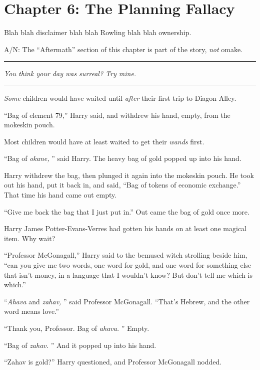 \chapter{Chapter 6: The Planning Fallacy}
Blah blah disclaimer blah blah Rowling blah blah ownership.

A/N: The ``Aftermath'' section of this chapter is part of the story,
\emph{not} omake.

\begin{center}\rule{3in}{0.4pt}\end{center}

\emph{You think your day was surreal? Try mine.}

\begin{center}\rule{3in}{0.4pt}\end{center}

\emph{Some} children would have waited until \emph{after} their first
trip to Diagon Alley.

``Bag of element 79,'' Harry said, and withdrew his hand, empty, from
the mokeskin pouch.

Most children would have at least waited to get their \emph{wands}
first.

``Bag of \emph{okane,} '' said Harry. The heavy bag of gold popped up into
his hand.

Harry withdrew the bag, then plunged it again into the mokeskin pouch.
He took out his hand, put it back in, and said, ``Bag of tokens of
economic exchange.'' That time his hand came out empty.

``Give me back the bag that I just put in.'' Out came the bag of gold
once more.

Harry James Potter-Evans-Verres had gotten his hands on at least one
magical item. Why wait?

``Professor McGonagall,'' Harry said to the bemused witch strolling
beside him, ``can you give me two words, one word for gold, and one word
for something else that isn't money, in a language that I wouldn't know?
But don't tell me which is which.''

``\emph{Ahava} and \emph{zahav,} '' said Professor McGonagall. ``That's
Hebrew, and the other word means love.''

``Thank you, Professor. Bag of \emph{ahava.} '' Empty.

``Bag of \emph{zahav.} '' And it popped up into his hand.

``Zahav is gold?'' Harry questioned, and Professor McGonagall nodded.

